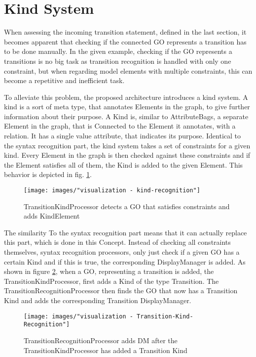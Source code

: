 \section{Kind System}
When assessing the incoming transition statement, defined in the last section, it becomes apparent that checking if the connected GO represents a transition has to be done manually. In the given example, checking if the GO represents a transitions is no big task as transition recognition is handled with only one constraint, but when regarding model elements with multiple constraints, this can become a repetitive and inefficient task. 

To alleviate this problem, the proposed architecture introduces a kind system. A kind is a sort of meta type, that annotates Elements in the graph, to give further information about their purpose. A Kind is, similar to AttributeBags, a separate Element in the graph, that is Connected to the Element it annotates, with a relation. It has a single value attribute, that indicates its purpose. Identical to the syntax recognition part, the kind system takes a set of constraints for a given kind. Every Element in the graph is then checked against these constraints and if the Element satisfies all of them, the Kind is added to the given Element. This behavior is depicted in fig. \ref{fig:kind-recognition}.

\begin{figure}
  \centering
  \texttt{[image: images/"visualization - kind-recognition"]}
  \caption{TransitionKindProcessor detects a GO that satisfies constraints and adds KindElement}
  \label{fig:kind-recognition}
\end{figure}

The similarity To the syntax recognition part means that it can actually replace this part, which is done in this Concept. Instead of checking all constraints themselves, syntax recognition processors, only just check if a given GO has a certain Kind and if this is true, the corresponding DisplayManager is added. As shown in figure \ref{fig:Transition-Kind-Recognition}, when a GO, representing a transition is added, the TransitionKindProcessor, first adds a Kind of the type Transition. The TransitionRecognitionProcessor then finds the GO that now has a Transition Kind and adds the corresponding Transition DisplayManager.

\begin{figure}[ht]
\centering
\texttt{[image: images/"visualization - Transition-Kind-Recognition"]}
\caption{TransitionRecognitionProcessor adds DM after the TransitionKindProcessor has added a Transition Kind}
\label{fig:Transition-Kind-Recognition}
\end{figure}

